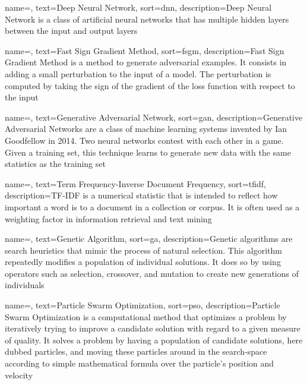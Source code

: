 {
    name=,
    text=Deep Neural Network,
    sort=dnn,
    description={Deep Neural Network is a class of artificial neural networks that has multiple hidden layers between the input and output layers}
}

{
    name=,
    text=Fast Sign Gradient Method,
    sort=fsgm,
    description={Fast Sign Gradient Method is a method to generate adversarial examples. It consists in adding a small perturbation to the input of a model. The perturbation is computed by taking the sign of the gradient of the loss function with respect to the input}
}

{
    name=,
    text=Generative Adversarial Network,
    sort=gan,
    description={Generative Adversarial Networks are a class of machine learning systems invented by Ian Goodfellow in 2014. Two neural networks contest with each other in a game. Given a training set, this technique learns to generate new data with the same statistics as the training set}
}


{
    name=,
    text=Term Frequency-Inverse Document Frequency,
    sort=tfidf,
    description={TF-IDF is a numerical statistic that is intended to reflect how important a word is to a document in a collection or corpus. It is often used as a weighting factor in information retrieval and text mining}
}

{
    name=,
    text=Genetic Algorithm,
    sort=ga,
    description={Genetic algorithms are search heuristics that mimic the process of natural selection. This algorithm repeatedly modifies a population of individual solutions. It does so by using operators such as selection, crossover, and mutation to create new generations of individuals}
}

{
    name=,
    text=Particle Swarm Optimization,
    sort=pso,
    description={Particle Swarm Optimization is a computational method that optimizes a problem by iteratively trying to improve a candidate solution with regard to a given measure of quality. It solves a problem by having a population of candidate solutions, here dubbed particles, and moving these particles around in the search-space according to simple mathematical formula over the particle's position and velocity}
}

